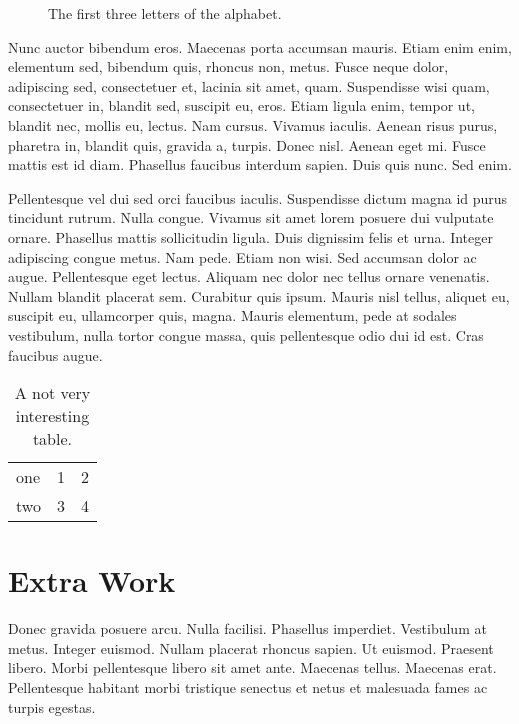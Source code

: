 \documentclass[oneside]{umnStatThesis}
\begin{document}
\begin{figure}
\quad
{}
\quad
{}
\caption{The first three letters of the alphabet.}
\label{fig:abc}
\end{figure}



Nunc auctor bibendum eros. Maecenas porta accumsan mauris. Etiam enim enim, elementum sed, bibendum quis, rhoncus non, metus. Fusce neque dolor, adipiscing sed, consectetuer et, lacinia sit amet, quam. Suspendisse wisi quam, consectetuer in, blandit sed, suscipit eu, eros. Etiam ligula enim, tempor ut, blandit nec, mollis eu, lectus. Nam cursus. Vivamus iaculis. Aenean risus purus, pharetra in, blandit quis, gravida a, turpis. Donec nisl. Aenean eget mi. Fusce mattis est id diam. Phasellus faucibus interdum sapien. Duis quis nunc. Sed enim.

Pellentesque vel dui sed orci faucibus iaculis. Suspendisse dictum magna id purus tincidunt rutrum. Nulla congue. Vivamus sit amet lorem posuere dui vulputate ornare. Phasellus mattis sollicitudin ligula. Duis dignissim felis et urna. Integer adipiscing congue metus. Nam pede. Etiam non wisi. Sed accumsan dolor ac augue. Pellentesque eget lectus. Aliquam nec dolor nec tellus ornare venenatis. Nullam blandit placerat sem. Curabitur quis ipsum. Mauris nisl tellus, aliquet eu, suscipit eu, ullamcorper quis, magna. Mauris elementum, pede at sodales vestibulum, nulla tortor congue massa, quis pellentesque odio dui id est. Cras faucibus augue.

\begin{table}
\centering
\begin{tabular}{l|rr}
one & 1 & 2 \\
two & 3 & 4
\end{tabular}
\caption{A not very interesting table.}
\label{table:interesting}
\end{table}



\appendix

\chapter{Extra Work}

Donec gravida posuere arcu. Nulla facilisi. Phasellus imperdiet. Vestibulum at metus. Integer euismod. Nullam placerat rhoncus sapien. Ut euismod. Praesent libero. Morbi pellentesque libero sit amet ante. Maecenas tellus. Maecenas erat. Pellentesque habitant morbi tristique senectus et netus et malesuada fames ac turpis egestas.
\end{document}
